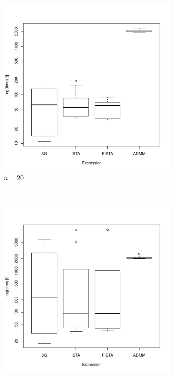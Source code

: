 \documentclass[12pt, leqno]{article}
\theoremstyle{remark}
\begin{document}
\begin{figure}[H]
  \centering
    \begin{subfigure}[b]{0.4\textwidth}
        \includegraphics[width=\textwidth]{20timing.pdf}
        \caption{$n=20$}
        \label{fig:20}
    \end{subfigure}
~
    \begin{subfigure}[b]{0.4\textwidth}
        \includegraphics[width=\textwidth]{50timing.pdf}

\end{subfigure}
\end{figure}
\end{document}

